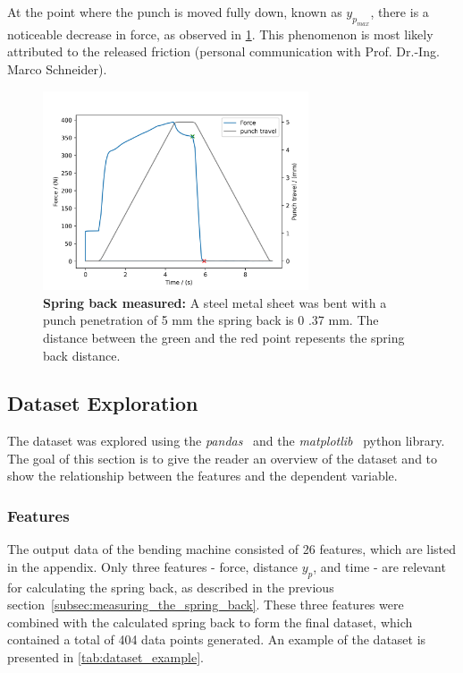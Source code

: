 {At the point where the punch is moved fully down, known as $y_p_{max}$, there is a noticeable decrease in force, as
observed in \cref{fig:springback_measured}.
This phenomenon is most likely attributed to the released friction (personal communication with Prof. Dr.-Ing. Marco
Schneider).

\begin{figure}[H]
    \begin{tcolorbox}[arc=0pt,boxrule=0.5pt]
        \centering
        \includegraphics[width=0.7\textwidth]{chap4/images/t1,5_V30_y_5_1.TRA.csv_springback}
    \end{tcolorbox}
    \caption{\textbf{Spring back measured:} A steel metal sheet was bent with a punch penetration of 5
    mm the spring back is 0 .37 mm.
    The distance between the green and the red point repesents the spring back distance.}
    \label{fig:springback_measured}
\end{figure}

\subsection{Dataset Exploration}\label{subsec:dataset-exploration}
The dataset was explored using the \textit{pandas}~\cite{mckinney-proc-scipy-2010}
and the \textit{matplotlib}~\cite{Hunter:2007} python library.
The goal of this section is to give the reader an overview of the dataset and
to show the relationship between the features and the dependent variable.

\subsubsection{Features}
The output data of the bending machine consisted of 26 features, which are listed in
the appendix.
Only three features - force, distance $y_p$, and time - are relevant for
calculating the spring back, as described in the previous section~\ref{subsec:measuring_the_spring_back}.
These three features were combined with the calculated spring back to form the final
dataset, which contained a total of 404 data points generated.
An example of the dataset is presented in \cref{tab:dataset_example}.

}
